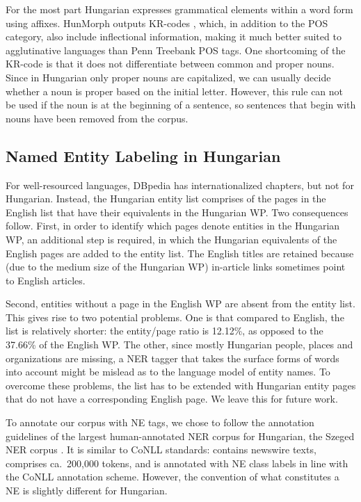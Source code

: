 \documentclass[11pt]{article}
\begin{document}
For the most part Hungarian expresses grammatical elements within a word form
using affixes. HunMorph outputs KR-codes \cite{Kornai:04}, which, in addition
to the POS category, also include inflectional information, making it much
better suited to agglutinative languages than Penn Treebank POS tags. One
shortcoming of the KR-code is that it does not differentiate between common
and proper nouns. Since in Hungarian only proper nouns are capitalized, we can
usually decide whether a noun is proper based on the initial letter. However,
this rule can not be used if the noun is at the beginning of a sentence, so
sentences that begin with nouns have been removed from the corpus.

\subsection{Named Entity Labeling in Hungarian}

For well-resourced languages, DBpedia has internationalized chapters, 
but not for Hungarian. Instead, the Hungarian entity list comprises of the
pages in the English list that have their equivalents in the Hungarian WP. Two
consequences follow.  First, in order to identify which pages denote entities
in the Hungarian WP, an additional step is required, in which the Hungarian
equivalents of the English pages are added to the entity list. The English
titles are retained because (due to the medium size of the Hungarian WP)
in-article links sometimes point to English articles.

Second, entities without a page in the English WP are absent from the entity
list. This gives rise to two potential problems. One is that compared to
English, the list is relatively shorter: the entity/page ratio is 12.12\%, as
opposed to the 37.66\% of the English WP. The other, since mostly Hungarian
people, places and organizations are missing, a NER tagger that takes the
surface forms of words into account might be mislead as to the language model
of entity names. To overcome these problems, the list has to be extended with
Hungarian entity pages that do not have a corresponding English page. We leave
this for future work.

To annotate our corpus with NE tags, we chose to follow the annotation
guidelines of the largest human-annotated NER corpus for Hungarian, the Szeged
NER corpus \cite{Szarvas:06}. It is similar to CoNLL standards: contains
newswire texts, comprises ca.~200,000 tokens, and is annotated with NE class
labels in line with the CoNLL annotation scheme. However, the convention of
what constitutes a NE is slightly different for Hungarian.
\end{document}
